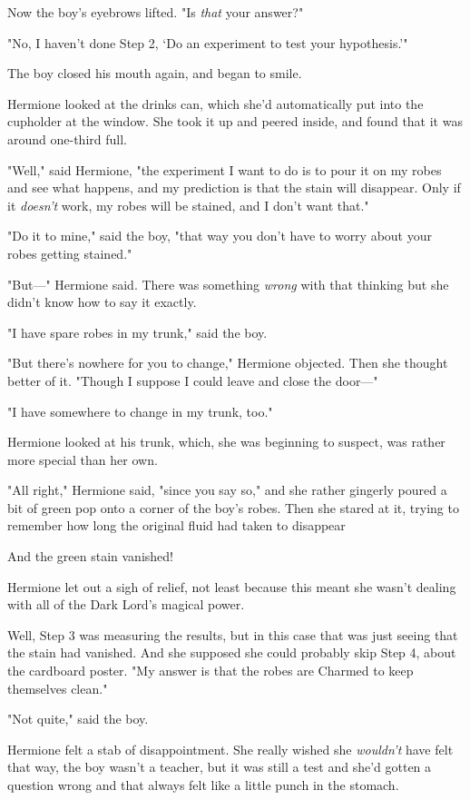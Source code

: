 Now the boy's eyebrows lifted. "Is \emph{that} your answer?"

"No, I haven't done Step 2, `Do an experiment to test your hypothesis.'"

The boy closed his mouth again, and began to smile.

Hermione looked at the drinks can, which she'd automatically put into the
cupholder at the window. She took it up and peered inside, and found that it
was around one-third full.

"Well," said Hermione, "the experiment I want to do is to pour it on my robes
and see what happens, and my prediction is that the stain will disappear. Only
if it \emph{doesn't} work, my robes will be stained, and I don't want that."

"Do it to mine," said the boy, "that way you don't have to worry about your
robes getting stained."

"But\mbox{---}" Hermione said. There was something \emph{wrong} with that thinking but
she didn't know how to say it exactly.

"I have spare robes in my trunk," said the boy.

"But there's nowhere for you to change," Hermione objected. Then she thought
better of it. "Though I suppose I could leave and close the door\mbox{---}"

"I have somewhere to change in my trunk, too."

Hermione looked at his trunk, which, she was beginning to suspect, was rather
more special than her own.

"All right," Hermione said, "since you say so," and she rather gingerly poured
a bit of green pop onto a corner of the boy's robes. Then she stared at it,
trying to remember how long the original fluid had taken to disappear{\el}

And the green stain vanished!

Hermione let out a sigh of relief, not least because this meant she wasn't
dealing with all of the Dark Lord's magical power.

Well, Step 3 was measuring the results, but in this case that was just seeing
that the stain had vanished. And she supposed she could probably skip Step 4,
about the cardboard poster. "My answer is that the robes are Charmed to keep
themselves clean."

"Not quite," said the boy.

Hermione felt a stab of disappointment. She really wished she \emph{wouldn't}
have felt that way, the boy wasn't a teacher, but it was still a test and she'd
gotten a question wrong and that always felt like a little punch in the stomach.


